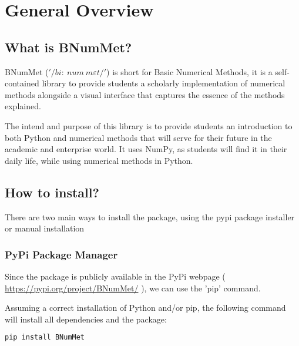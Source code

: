 \section{General Overview}
\subsection{What is BNumMet?}
BNumMet ($'/bi:\ num\ m\varepsilon t/'$) is short for Basic Numerical Methods, it is a self-contained library to provide students a scholarly implementation of numerical methods alongside a visual interface that captures the essence of the methods explained.

The intend and purpose of this library is to provide students an introduction to both Python and numerical methods that will serve for their future in the academic and enterprise world. It uses NumPy, as students will find it in their daily life, while using numerical methods in Python. 



\subsection{How to install?}
There are two main ways to install the package, using the pypi package installer or manual installation
\subsubsection{PyPi Package Manager}
Since the package is publicly available in the PyPi webpage ( \href{https://pypi.org/project/BNumMet/}{https://pypi.org/project/BNumMet/} ), we can use the 'pip' command.

Assuming a correct installation of Python and/or pip, the following command will install all dependencies and the package:
\begin{lstlisting}[language=Python]
pip install BNumMet
\end{lstlisting}

